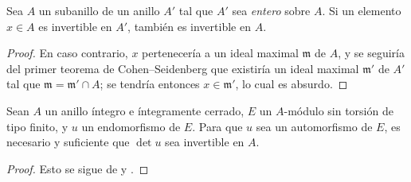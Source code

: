 \documentclass[oneside,10pt]{amsart}
\let\EGAOriginalLabel\label
\renewcommand{\label}[1]{\phantomsection\EGAOriginalLabel{#1}}
\begin{document}
\begin{lemma}[6.4.5.1]
\label{II.6.4.5.1}
Sea $A$ un subanillo de un anillo $A'$ tal que $A'$ sea \emph{entero} sobre $A$.
Si un elemento $x\in A$ es invertible en $A'$, también es invertible en $A$.
\end{lemma}

\begin{proof}
En caso contrario, $x$ pertenecería a un ideal maximal $\mathfrak{m}$ de $A$, y se seguiría del primer teorema de Cohen--Seidenberg \cite[t.~I, p.~257, th.~3]{I-13} que existiría un ideal maximal $\mathfrak{m}'$ de $A'$ tal que $\mathfrak{m}=\mathfrak{m}'\cap A$;
se tendría entonces $x\in\mathfrak{m}'$, lo cual es absurdo.
\end{proof}

\begin{corollary}[6.4.6]
\label{II.6.4.6}
Sean $A$ un anillo íntegro e íntegramente cerrado, $E$ un $A$-módulo sin torsión de tipo finito, y $u$ un endomorfismo de $E$.
Para que $u$ sea un automorfismo de $E$, es necesario y suficiente que $\det u$ sea invertible en $A$.
\end{corollary}

\begin{proof}
Esto se sigue de  y .
\end{proof}
\end{document}
